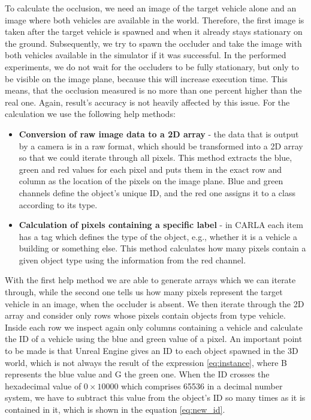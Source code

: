  To calculate the occlusion, we need an image of the target vehicle alone and an image where both vehicles are available in the world. Therefore, the first image is taken after the target vehicle is spawned and when it already stays stationary on the ground. Subsequently, we try to spawn the occluder and take the image with both vehicles available in the simulator if it was successful. In the performed experiments, we do not wait for the occluders to be fully stationary, but only to be visible on the image plane, because this will increase execution time. This means, that the occlusion measured is no more than one percent higher than the real one. Again, result's accuracy is not heavily affected by this issue. For the calculation we use the following help methods:
 \begin{itemize}
     \item \textbf{Conversion of raw image data to a 2D array} - the data that is output by a camera is in a raw format, which should be transformed into a 2D array so that we could iterate through all pixels. This method extracts the blue, green and red values for each pixel and puts them in the exact row and column as the location of the pixels on the image plane. Blue and green channels define the object's unique ID, and the red one assigns it to a class according to its type.
     \item \textbf{Calculation of pixels containing a specific label} - in CARLA each item has a tag which defines the type of the object, e.g., whether it is a vehicle a building or something else. This method calculates how many pixels contain a given object type using the information from the red channel. 
 \end{itemize}

With the first help method we are able to generate arrays which we can iterate through, while the second one tells us how many pixels represent the target vehicle in an image, when the occluder is absent. We then iterate through the 2D array and consider only rows whose pixels contain objects from type vehicle. Inside each row we inspect again only columns containing a vehicle and calculate the ID of a vehicle using the blue and green value of a pixel. An important point to be made is that Unreal Engine gives an ID to each object spawned in the 3D world, which is not always the result of the expression \ref{eq:instance}, where B represents the blue value and G the green one.
When the ID crosses the hexadecimal value of $0\times10000$ which comprises 65536 in a decimal number system, we have to subtract this value from the object's ID so many times as it is contained in it, which is shown in the equation \ref{eq:new_id}.

